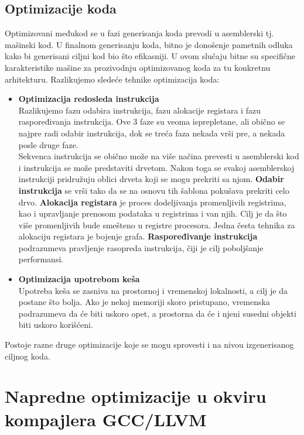 \documentclass[a4paper]{article}
\begin{document}
\subsection{Optimizacije koda}
\label{subsec:optimizacija_kod}
Optimizovani međukod se u fazi generisanja koda prevodi u asemblerski tj. mašinski kod. 
U finalnom generisanju koda, bitno je donošenje pametnih odluka kako bi generisani ciljni kod bio što efikasniji. 
U ovom slučaju bitne su specifične karakteristike mašine za prozivodnju optimizovanog koda za tu konkretnu arhitekturu. 
Razlikujemo sledeće tehnike optimizacija koda:
\begin{itemize}
  \item \textbf{Optimizacija redosleda instrukcija} \\
  Razlikujemo fazu odabira instrukcija, fazu alokacije registara i fazu raspoređivanja instrukcija. Ove 3 faze su veoma isprepletane, ali obično se najpre radi odabir instrukcija, 
  dok se treća faza nekada vrši pre, a nekada posle druge faze. \\
  Sekvenca instrukcija se obično može na više načina prevesti u asemblerski kod i instrukcija se može predstaviti drvetom. 
  Nakon toga se svakoj asemblerskoj instrukciji pridružuju oblici drveta koji se mogu prekriti sa njom. 
  \textbf{Odabir instrukcija } se vrši tako da se na osnovu tih šablona pokušava prekriti celo drvo.
  \textbf{Alokacija registara } je proces dodeljivanja promenljivih registrima, kao i upravljanje prenosom podataka u registrima i van njih. 
  Cilj je da što više promenljivih bude smešteno u registre procesora. 
  Jedna česta tehnika za alokaciju registara je bojenje grafa.
  \textbf{Raspoređivanje instrukcija} podrazumeva pravljenje rasopreda instrukcija, čiji je cilj poboljšanje performansi.
  \item \textbf{Optimizacija upotrebom keša} \\
  Upotreba keša se zasniva na prostornoj i vremenskoj lokalnosti, a cilj je da postane što bolja.
  Ako je nekoj memoriji skoro pristupano, vremenska podrazumeva da će biti uskoro opet, a prostorna da će i njeni susedni objekti biti uskoro korišćeni.
 
\end{itemize} 
Postoje razne druge optimizacije koje se mogu sprovesti i na nivou izgenerisanog ciljnog koda. \cite{kkMVJ}


\section{Napredne optimizacije u okviru kompajlera GCC/LLVM}
\label{sec:napredneOptimizacije}
\end{document}
